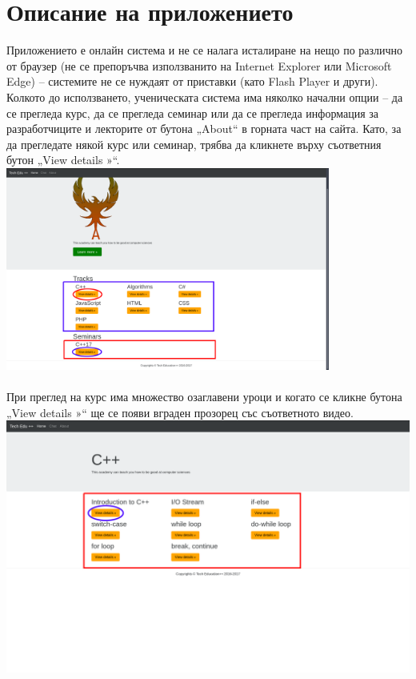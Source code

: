 \documentclass[12pt]{article}
\begin{document}
	\section{Описание на приложението}
	Приложението е онлайн система и не се налага исталиране на нещо по различно от браузер (не се препоръчва използванито на Internet Explorer или Microsoft Edge) – системите не се нуждаят от приставки (като Flash Player и други).\\ 
	Колкото до исползването, ученическата система има няколко начални опции – да се прегледа курс, да се прегледа семинар или да се прегледа информация за разработчиците и лекторите от бутона „About“ в горната част на сайта. Като, за да прегледате някой курс или семинар, трябва да кликнете върху съответния бутон „View details »“.\\
	\includegraphics[width=0.8\textwidth]{track_view.png}\\
	\\При преглед на курс има множество озаглавени уроци и когато се кликне бутона „View details »“ ще се появи вграден прозорец със съответното видео.\\
	\includegraphics[width=1\textwidth]{view_details.png}\\
\end{document}
